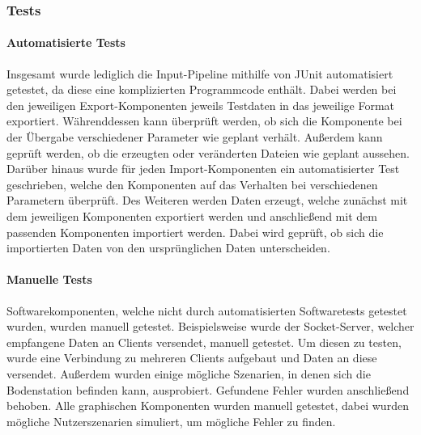 \subsubsection{Tests}
\paragraph{Automatisierte Tests}
Insgesamt wurde lediglich die Input-Pipeline mithilfe von JUnit automatisiert getestet, da diese eine komplizierten Programmcode enthält.
Dabei werden bei den jeweiligen Export-Komponenten jeweils Testdaten in das jeweilige Format exportiert. Währenddessen kann überprüft werden, ob sich die Komponente bei der Übergabe verschiedener Parameter wie geplant verhält. Außerdem kann geprüft werden, ob die erzeugten oder veränderten Dateien wie geplant aussehen. Darüber hinaus wurde für jeden Import-Komponenten ein automatisierter Test geschrieben, welche den Komponenten auf das Verhalten bei verschiedenen Parametern überprüft. Des Weiteren werden Daten erzeugt, welche zunächst mit dem jeweiligen Komponenten exportiert werden und anschließend mit dem passenden Komponenten importiert werden. Dabei wird geprüft, ob sich die importierten Daten von den ursprünglichen Daten unterscheiden.

\paragraph{Manuelle Tests}
Softwarekomponenten, welche nicht durch automatisierten Softwaretests getestet wurden, wurden manuell getestet. Beispielsweise wurde der Socket-Server, welcher empfangene Daten an Clients versendet, manuell getestet. Um diesen zu testen, wurde eine Verbindung zu mehreren Clients aufgebaut und Daten an diese versendet. Außerdem wurden einige mögliche Szenarien, in denen sich die Bodenstation befinden kann, ausprobiert. Gefundene Fehler wurden anschließend behoben. Alle graphischen Komponenten wurden manuell getestet, dabei wurden mögliche Nutzerszenarien simuliert, um mögliche Fehler zu finden.